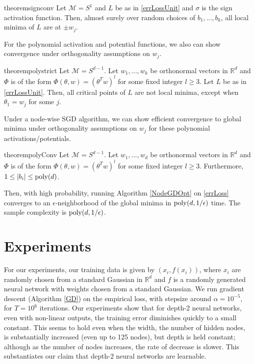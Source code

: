 \documentclass{article}
\newcommand{\R}{{\mathbb{R}}}
\begin{document}
\begin{restatable}{theorem}{signconv}
\label{SignConv}
Let $\mathcal{M} = S^1$ and $L$ be as in \eqref{errLossUnit} and $\sigma$ is the sign activation function. Then, almost surely over random choices of $b_1,...,b_k$, all local minima of $L$ are at $\pm w_j$. 
\end{restatable}
%
For the polynomial activation and potential functions, we also can show convergence under orthogonality assumptions on $w_j$. 

\begin{restatable}{theorem}{polystrict}
\label{PolyStrict}
Let $\mathcal{M} = S^{d-1}$. Let $w_1,...,w_k$ be orthonormal vectors in $\R^d$ and $\Phi$ is of the form $\Phi(\theta,w) = (\theta^Tw)^l$ for some fixed integer $l \geq 3$. Let $L$ be as in \eqref{errLossUnit}. Then, all critical points of $L$ are not local minima, except when $\theta_1 = w_j$ for some $j$.   
\end{restatable}

Under a node-wise SGD algorithm, we can show efficient convergence to global minima under orthogonality assumptions on $w_j$ for these polynomial activations/potentials.

\begin{restatable}{theorem}{polyConv}
\label{PolyConv}
Let $\mathcal{M} = S^{d-1}$. Let $w_1,...,w_d$ be orthonormal vectors in $\R^d$ and $\Phi$ is of the form $\Phi(\theta,w) = (\theta^Tw)^l$ for some fixed integer $l \geq 3$. Furthermore, $1 \leq |b_i|\leq \mathrm{poly}(d)$. 

Then, with high probability, running Algorithm \ref{NodeGDOpt} on \eqref{errLoss} converges to an $\epsilon$-neighborhood of the global minima in $\mathrm{poly}(d,1/\epsilon)$ time. The sample complexity is $\mathrm{poly}(d,1/\epsilon)$.
\end{restatable}


\section{Experiments}
\label{experiments}
For our experiments, our training data is given by $(x_i, f(x_i))$, where $x_i$ are randomly chosen from a standard Gaussian in $\R^d$ and $f$ is a randomly generated neural network with weights chosen from a standard Gaussian. We run gradient descent (Algorithm \ref{GD}) on the empirical loss, with stepsize around $\alpha = 10^{-5}$, for $T = 10^6$ iterations. Our experiments show that for depth-2 neural networks, even with non-linear outputs, the training error diminishes quickly to a small constant. This seems to hold even when the width, the number of hidden nodes, is substantially increased (even up to 125 nodes), but depth is held constant; although as the number of nodes increases, the rate of decrease is slower. This substantiates our claim that depth-2 neural networks are learnable.
\end{document}
